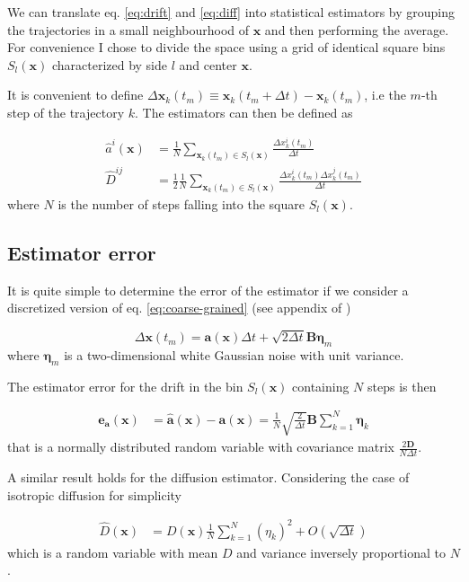 \documentclass[a4paper]{article}
\begin{document}
We can translate eq. \ref{eq:drift} and \ref{eq:diff} into statistical estimators by grouping the trajectories in a small neighbourhood of $\bm{x}$ and then performing the average. For convenience I chose to divide the space using a grid of identical square bins $S_l(\bm{x})$ characterized by side $l$ and center $\bm{x}$.

It is convenient to define $\Delta \bm{x}_k(t_m) \equiv \bm{x}_k(t_m + \Delta t) - \bm{x}_k(t_m)$, i.e the $m$-th step of the trajectory $k$. The estimators can then be defined as

\begin{align}
\hat{a}^i({\bm{x}}) &= \frac{1}{N} \sum_{\bm{x}_k(t_m) \in S_l(\bm{x})} \frac{\Delta x_k^i(t_m)}{\Delta t} \label{eq:drift-estimator} \\
\hat{D}^{ij} &= \frac{1}{2} \frac{1}{N} \sum_{\bm{x}_k(t_m) \in S_l(\bm{x})}\frac{\Delta x_k^i(t_m) \Delta x_k^j(t_m)}{\Delta t} \label{eq:diff-estimator}
\end{align}
where $N$ is the number of steps falling into the square $S_l(\bm{x})$.

\subsection{Estimator error}

It is quite simple to determine the error of the estimator if we consider a discretized version of eq. \ref{eq:coarse-grained} (see appendix of \cite{hoze2012})

\begin{equation}
\Delta \bm{x}(t_m) = \bm{a}(\bm{x}) \Delta t + \sqrt{2 \Delta t} \bm{B} \bm{\eta}_m
\end{equation}
where $\bm{\eta}_m$ is a two-dimensional white Gaussian noise with unit variance.

The estimator error for the drift in the bin $S_l(\bm{x})$ containing $N$ steps is then

\begin{align}
\bm{e_a}(\bm{x}) &= \hat{\bm{a}}(\bm{x}) - \bm{a}(\bm{x}) = \frac{1}{N} \sqrt{\frac{2}{\Delta t}} \bm{B} \sum_{k = 1}^N \bm{\eta}_k
\end{align}
that is a normally distributed random variable with covariance matrix $\frac{2 \bm{D}}{N \Delta t}$.

A similar result holds for the diffusion estimator. Considering the case of isotropic diffusion for simplicity

\begin{align}
\hat{D}(\bm{x}) &= D(\bm{x}) \frac{1}{N} \sum_{k = 1}^N \left(\eta_k\right)^2 + O(\sqrt{\Delta t})
\end{align}
which is a random variable with mean $D$ and variance inversely proportional to $N$.
\end{document}
